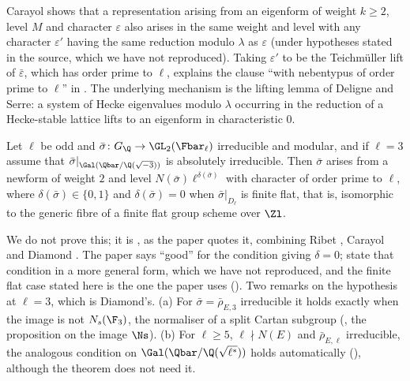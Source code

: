 \begin{remark}\label{rem:modgalrep:carayol-lemma}
Carayol \cite{Carayol89} shows that a representation arising from an eigenform of weight $k\ge2$, level $M$ and character $\varepsilon$ also arises in the same
weight and level with any character $\varepsilon'$ having the same reduction modulo $\lambda$ as $\varepsilon$ (under hypotheses stated in the source, which we have
not reproduced). Taking $\varepsilon'$ to be the Teichm\"uller lift of $\bar\varepsilon$, which has order prime to $\ell$, explains the clause ``with nebentypus of order prime
to $\ell$'' in . The underlying mechanism is the lifting lemma of Deligne and Serre: a system of Hecke eigenvalues
modulo $\lambda$ occurring in the reduction of a Hecke-stable lattice lifts to an eigenform in characteristic $0$.
\end{remark}

\begin{theorem}\label{thm:modgalrep:optimal-level}
Let $\ell$ be odd and $\bar\sigma\colon G_\Q\to\GL_2(\Fbar_\ell)$ irreducible and modular, and if $\ell=3$ assume that $\bar\sigma|_{\Gal(\Qbar/\Q(\sqrt{-3}))}$ is absolutely irreducible.
Then $\bar\sigma$ arises from a newform of weight $2$ and level $N(\bar\sigma)\ell^{\delta(\bar\sigma)}$ with character of order prime to $\ell$, where $\delta(\bar\sigma)\in\{0,1\}$ and
$\delta(\bar\sigma)=0$ when $\bar\sigma|_{D_\ell}$ is finite flat, that is, isomorphic to the generic fibre of a finite flat group scheme over $\Zl$.
\end{theorem}

We do not prove this; it is \cite[Theorem 3.15]{DDT}, as the paper quotes it, combining Ribet \cite{Ribet90}, Carayol \cite{Carayol89} and Diamond
\cite{Diamond95}. The paper says ``good'' for the condition giving $\delta=0$; \cite{DDT} state that condition in a more general form, which we have not
reproduced, and the finite flat case stated here is the one the paper uses (). Two remarks on the hypothesis at $\ell=3$, which
is Diamond's. (a) For $\bar\sigma=\bar\rho_{E,3}$ irreducible it holds exactly when the image is not
$N_s(\F_3)$, the normaliser of a split Cartan subgroup (, the proposition on the image $\Ns$). (b) For $\ell\ge5$, $\ell\nmid N(E)$ and $\bar\rho_{E,\ell}$
irreducible, the analogous condition on $\Gal(\Qbar/\Q(\sqrt{\ell^*}))$ holds automatically (), although the theorem does not need it.

